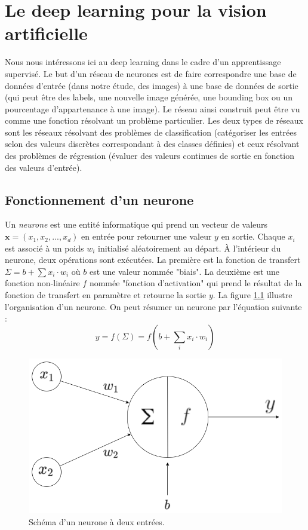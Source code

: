 \chapter{Le deep learning pour la vision artificielle}
\label{chap:deep-learning}
Nous nous intéressons ici au deep learning dans le cadre d'un apprentissage supervisé. Le but d'un réseau de neurones est de faire correspondre une base de données d'entrée (dans notre étude, des images) à une base de données de sortie (qui peut être des labels, une nouvelle image générée, une bounding box ou un pourcentage d'appartenance à une image). Le réseau ainsi construit peut être vu comme une fonction résolvant un problème particulier. Les deux types de réseaux sont les réseaux résolvant des problèmes de classification (catégoriser les entrées selon des valeurs discrètes correspondant à des classes définies) et ceux résolvant des problèmes de régression (évaluer des valeurs continues de sortie en fonction des valeurs d'entrée).

\section{Fonctionnement d'un neurone}
\label{sec:neurone}

Un \textit{neurone} est une entité informatique qui prend un vecteur de valeurs $\textbf{x} = (x_1, x_2, ..., x_d)$ en entrée pour retourner une valeur $y$ en sortie. Chaque $x_i$ est associé à un poids $w_i$ initialisé aléatoirement au départ. À l'intérieur du neurone, deux opérations sont exécutées. La première est la fonction de transfert $\Sigma = b + \sum{x_i \cdot w_i}$ où $b$ est une valeur nommée "biais". La deuxième est une fonction non-linéaire $f$ nommée "fonction d'activation" qui prend le résultat de la fonction de transfert en paramètre et retourne la sortie $y$. La figure \ref{fig:schema-neurone} illustre l'organisation d'un neurone. On peut résumer un neurone par l'équation suivante :
\begin{equation}
    y = f(\Sigma) = f(b + \sum_i{x_i \cdot w_i})
\end{equation}

\begin{figure}[!h]
\centering
\includegraphics[scale=0.5]{img/neurone.PNG}
\caption{Schéma d'un neurone à deux entrées.}
\label{fig:schema-neurone}
\end{figure}

